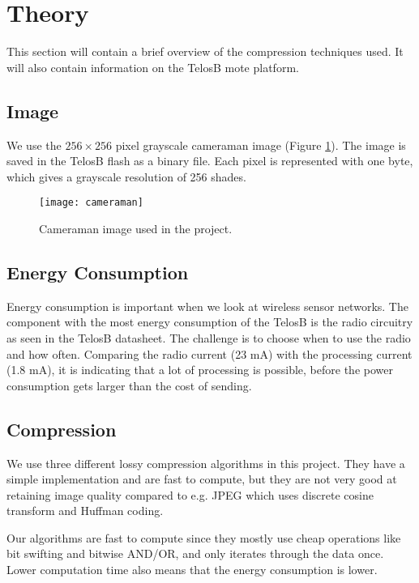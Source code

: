\section{Theory}
This section will contain a brief overview of the compression techniques used. It will also contain information on the TelosB mote platform.


\subsection{Image}
We use the $256 \times 256$ pixel grayscale cameraman image (Figure \ref{fig:image_cameraman}). 
The image is saved in the TelosB flash as a binary file. Each pixel is represented with one byte, which gives a grayscale resolution of 256 shades.

\begin{figure}[ht!]
\centering
\texttt{[image: cameraman]}
\caption{Cameraman image used in the project.}
\label{fig:image_cameraman}
\end{figure}

\subsection{Energy Consumption}
Energy consumption is important when we look at wireless sensor networks. 
The component with the most energy consumption of the TelosB is the radio circuitry as seen in the TelosB datasheet\cite{dataSheet}. 
The challenge is to choose when to use the radio and how often. 
Comparing the radio current (23 mA) with the processing current (1.8 mA), it is indicating that a lot of processing is possible, before the power consumption gets larger than the cost of sending. 

\subsection{Compression}

We use three different lossy compression algorithms in this project.
They have a simple implementation and are fast to compute, but they are not very good at retaining image quality compared to e.g. JPEG which uses discrete cosine transform and Huffman coding.

Our algorithms are fast to compute since they mostly use cheap operations like bit swifting and bitwise AND/OR, and only iterates through the data once.
Lower computation time also means that the energy consumption is lower.

